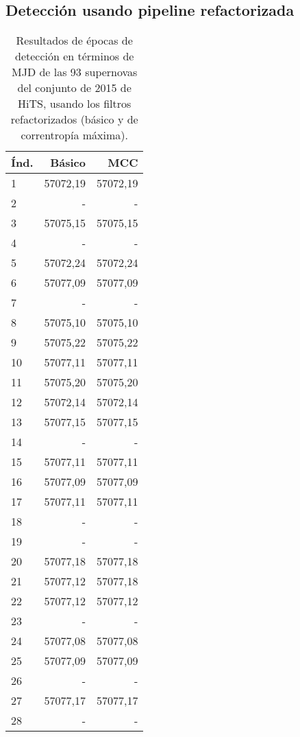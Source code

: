 \begin{appendix}
\section{Detecci\'on usando pipeline refactorizada}
\label{ap:pip_ref}
\begin{table}[h!]
\small
\centering
\caption{Resultados de \'epocas de detecci\'on en t\'erminos de MJD de las 93 supernovas del conjunto de 2015 de HiTS, usando los filtros refactorizados (b\'asico y de correntrop\'ia m\'axima).}
\begin{tabular}{|l|r|r|}
\hline
\textbf{\'Ind.} & \textbf{B\'asico} & \textbf{MCC} \\\hline
1& 57072,19   & 57072,19   \\
2& -              & -              \\
3& 57075,15    & 57075,15     \\
4& -   & -   \\
5& 57072,24   & 57072,24   \\
6& 57077,09   & 57077,09   \\
7& -              & -              \\
8& 57075,10   & 57075,10   \\
9& 57075,22   & 57075,22   \\
10& 57077,11   & 57077,11   \\
11& 57075,20    & 57075,20    \\
12& 57072,14   & 57072,14   \\
13& 57077,15   & 57077,15   \\
14& -    & -    \\
15& 57077,11   & 57077,11   \\
16& 57077,09   & 57077,09   \\
17& 57077,11   & 57077,11   \\
18& -   & -   \\
19& -              & -              \\
20& 57077,18   & 57077,18   \\
21& 57077,12   & 57077,18   \\
22& 57077,12  & 57077,12   \\
23& -              & -              \\
24& 57077,08    & 57077,08             \\
25& 57077,09   & 57077,09   \\
26& -   & -   \\
27& 57077,17   & 57077,17   \\
28& -              & -              \\

\end{tabular}
\end{table}
\end{appendix}
